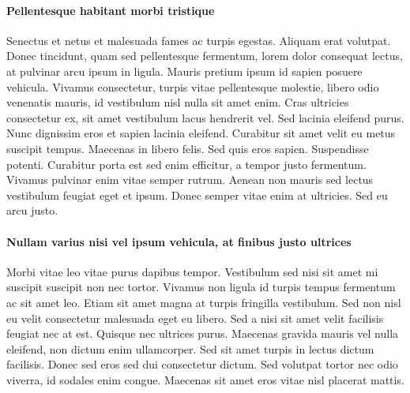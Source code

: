 \paragraph{Pellentesque habitant morbi tristique} Senectus et netus et malesuada fames ac turpis egestas. Aliquam erat volutpat. Donec tincidunt, quam sed pellentesque fermentum, lorem dolor consequat lectus, at pulvinar arcu ipsum in ligula. Mauris pretium ipsum id sapien posuere vehicula. Vivamus consectetur, turpis vitae pellentesque molestie, libero odio venenatis mauris, id vestibulum nisl nulla sit amet enim. Cras ultricies consectetur ex, sit amet vestibulum lacus hendrerit vel. Sed lacinia eleifend purus. Nunc dignissim eros et sapien lacinia eleifend. Curabitur sit amet velit eu metus suscipit tempus. Maecenas in libero felis. Sed quis eros sapien. Suspendisse potenti. Curabitur porta est sed enim efficitur, a tempor justo fermentum. Vivamus pulvinar enim vitae semper rutrum. Aenean non mauris sed lectus vestibulum feugiat eget et ipsum. Donec semper vitae enim at ultricies. Sed eu arcu justo.

\paragraph{Nullam varius nisi vel ipsum vehicula, at finibus justo ultrices} Morbi vitae leo vitae purus dapibus tempor. Vestibulum sed nisi sit amet mi suscipit suscipit non nec tortor. Vivamus non ligula id turpis tempus fermentum ac sit amet leo. Etiam sit amet magna at turpis fringilla vestibulum. Sed non nisl eu velit consectetur malesuada eget eu libero. Sed a nisi sit amet velit facilisis feugiat nec at est. Quisque nec ultrices purus. Maecenas gravida mauris vel nulla eleifend, non dictum enim ullamcorper. Sed sit amet turpis in lectus dictum facilisis. Donec sed eros sed dui consectetur dictum. Sed volutpat tortor nec odio viverra, id sodales enim congue. Maecenas sit amet eros vitae nisl placerat mattis.
